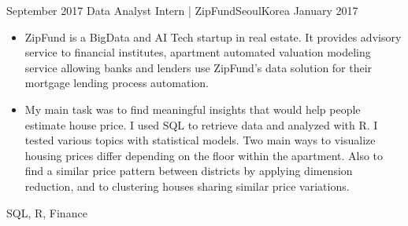 \begin{experiences}
  
 \experience
    {September 2017} {Data Analyst Intern | ZipFund}{Seoul}{Korea}
    {January 2017}    {\begin{itemize}
               \item ZipFund is a BigData and AI Tech startup in real estate. It provides advisory service to financial institutes, apartment automated valuation modeling service allowing banks and lenders use ZipFund's data solution for their mortgage lending process automation.

               \item  My main task was to find meaningful insights that would help people estimate house price. I used SQL to retrieve data and analyzed with R. I tested various topics with statistical models. Two main ways to visualize housing prices differ depending on the floor within the apartment. Also to find a similar price pattern between districts by applying dimension reduction, and to clustering houses sharing similar price variations. 
               \end{itemize}}
            {SQL, R, Finance}
  \emptySeparator
  
  
  
  
\end{experiences}
